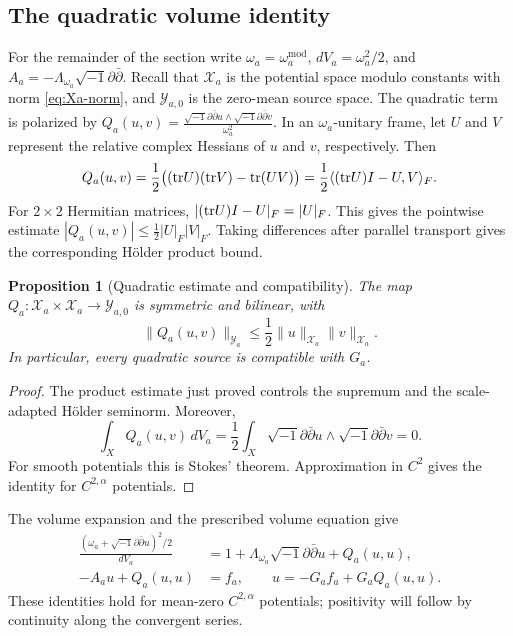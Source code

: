 \documentclass[11pt,a4paper,twoside]{article}
\numberwithin{equation}{section}
\newcommand{\ddc}{\sqrt{-1}\partial\bar\partial}
\newtheorem{proposition}[theorem]{Proposition}
\theoremstyle{definition}
\theoremstyle{remark}
\newcommand{\tr}{\textup{tr}}
\begin{document}
\subsection{The quadratic volume identity}
\label{subsec:quadratic-term}
For the remainder of the section write
\(\omega_a=\omega_a^{\mathrm{mod}}\),
\(dV_a=\omega_a^2/2\), and \(A_a=-\Lambda_{\omega_a}\ddc\).
Recall that \(\mathcal X_a\) is the potential space modulo
constants with norm \eqref{eq:Xa-norm}, and
\(\mathcal Y_{a,0}\) is the zero-mean source space.
The quadratic term is polarized by
\(Q_a(u,v)=\frac{\ddc u\wedge\ddc v}{\omega_a^2}\).
In an \(\omega_a\)-unitary frame, let \(U\) and \(V\) represent
the relative complex Hessians of \(u\) and \(v\), respectively.
Then
\[
Q_a(u,v)=\frac12\bigl((\tr U)(\tr V)-\tr(UV)\bigr)
=\frac12\langle(\tr U)I-U,V\rangle_F.
\]
For \(2\times2\) Hermitian matrices,
\(|(\tr U)I-U|_F=|U|_F\). This gives the pointwise estimate
\(|Q_a(u,v)|\le\frac12|U|_F|V|_F\). Taking differences after
parallel transport gives the corresponding H\"older product bound.
\begin{proposition}[Quadratic estimate and compatibility]
\label{prop:uniform-quadratic}
The map \(Q_a:\mathcal X_a\times\mathcal X_a\to\mathcal Y_{a,0}\)
is symmetric and bilinear, with
\begin{equation}\label{eq:Qa-uniform}
\|Q_a(u,v)\|_{\mathcal Y_a}
\le\frac12\|u\|_{\mathcal X_a}\|v\|_{\mathcal X_a}.
\end{equation}
In particular, every quadratic source is compatible with \(G_a\).
\end{proposition}
\begin{proof}
The product estimate just proved controls the supremum and the
scale-adapted H\"older seminorm. Moreover,
\[
\int_XQ_a(u,v)\,dV_a
=\frac12\int_X\ddc u\wedge\ddc v=0.
\]
For smooth potentials this is Stokes' theorem. Approximation in
\(C^2\) gives the identity for \(C^{2,\alpha}\) potentials.
\end{proof}
The volume expansion and the prescribed volume equation give
\[
\begin{aligned}
\frac{(\omega_a+\ddc u)^2/2}{dV_a}
&=1+\Lambda_{\omega_a}\ddc u+Q_a(u,u),\\
-A_au+Q_a(u,u)&=f_a,
\qquad u=-G_af_a+G_aQ_a(u,u).
\end{aligned}
\]
These identities hold for mean-zero \(C^{2,\alpha}\) potentials;
positivity will follow by continuity along the convergent series.
\end{document}
